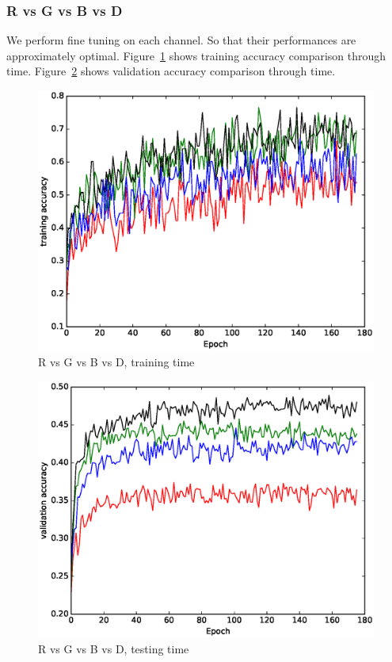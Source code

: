 \documentclass[journal]{IEEEtran}
\begin{document}
\subsubsection{R vs G vs B vs D}
We perform fine tuning on each channel. So that their performances are approximately optimal.
Figure~\ref{fig:channeltrain} shows training accuracy comparison through time. 
Figure~\ref{fig:channeltest} shows validation accuracy comparison through time. 
\begin{figure}
	\includegraphics[width=\linewidth]{../presentation/train.eps}
	\caption{R vs G vs B vs D, training time}
	\label{fig:channeltrain}
\end{figure}
\begin{figure}
	\includegraphics[width=\linewidth]{../presentation/test.eps}
	\caption{R vs G vs B vs D, testing time}
	\label{fig:channeltest}
\end{figure}
\end{document}
